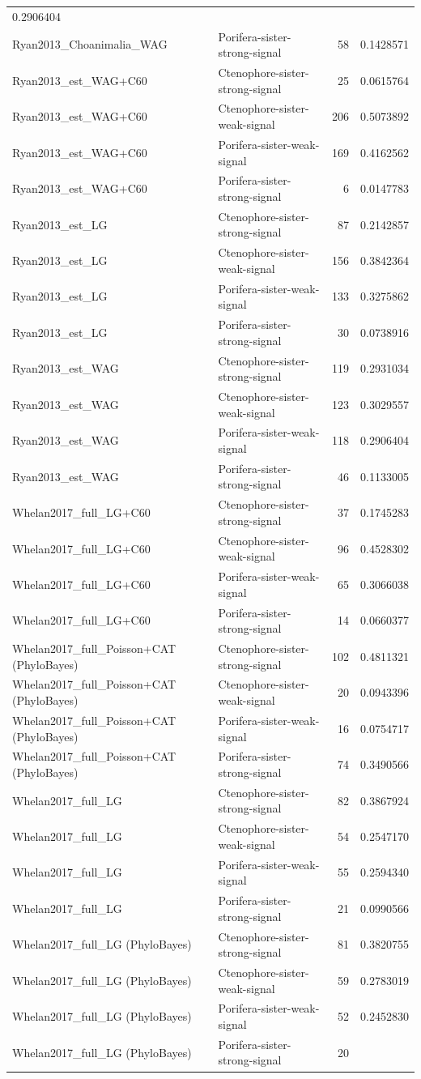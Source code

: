 \documentclass[]{article}
\begin{document}
\begin{longtable}[]{@{}llrr@{}}
0.2906404\tabularnewline
Ryan2013\_Choanimalia\_WAG & Porifera-sister-strong-signal & 58 &
0.1428571\tabularnewline
Ryan2013\_est\_WAG+C60 & Ctenophore-sister-strong-signal & 25 &
0.0615764\tabularnewline
Ryan2013\_est\_WAG+C60 & Ctenophore-sister-weak-signal & 206 &
0.5073892\tabularnewline
Ryan2013\_est\_WAG+C60 & Porifera-sister-weak-signal & 169 &
0.4162562\tabularnewline
Ryan2013\_est\_WAG+C60 & Porifera-sister-strong-signal & 6 &
0.0147783\tabularnewline
Ryan2013\_est\_LG & Ctenophore-sister-strong-signal & 87 &
0.2142857\tabularnewline
Ryan2013\_est\_LG & Ctenophore-sister-weak-signal & 156 &
0.3842364\tabularnewline
Ryan2013\_est\_LG & Porifera-sister-weak-signal & 133 &
0.3275862\tabularnewline
Ryan2013\_est\_LG & Porifera-sister-strong-signal & 30 &
0.0738916\tabularnewline
Ryan2013\_est\_WAG & Ctenophore-sister-strong-signal & 119 &
0.2931034\tabularnewline
Ryan2013\_est\_WAG & Ctenophore-sister-weak-signal & 123 &
0.3029557\tabularnewline
Ryan2013\_est\_WAG & Porifera-sister-weak-signal & 118 &
0.2906404\tabularnewline
Ryan2013\_est\_WAG & Porifera-sister-strong-signal & 46 &
0.1133005\tabularnewline
Whelan2017\_full\_LG+C60 & Ctenophore-sister-strong-signal & 37 &
0.1745283\tabularnewline
Whelan2017\_full\_LG+C60 & Ctenophore-sister-weak-signal & 96 &
0.4528302\tabularnewline
Whelan2017\_full\_LG+C60 & Porifera-sister-weak-signal & 65 &
0.3066038\tabularnewline
Whelan2017\_full\_LG+C60 & Porifera-sister-strong-signal & 14 &
0.0660377\tabularnewline
Whelan2017\_full\_Poisson+CAT (PhyloBayes) &
Ctenophore-sister-strong-signal & 102 & 0.4811321\tabularnewline
Whelan2017\_full\_Poisson+CAT (PhyloBayes) &
Ctenophore-sister-weak-signal & 20 & 0.0943396\tabularnewline
Whelan2017\_full\_Poisson+CAT (PhyloBayes) & Porifera-sister-weak-signal
& 16 & 0.0754717\tabularnewline
Whelan2017\_full\_Poisson+CAT (PhyloBayes) &
Porifera-sister-strong-signal & 74 & 0.3490566\tabularnewline
Whelan2017\_full\_LG & Ctenophore-sister-strong-signal & 82 &
0.3867924\tabularnewline
Whelan2017\_full\_LG & Ctenophore-sister-weak-signal & 54 &
0.2547170\tabularnewline
Whelan2017\_full\_LG & Porifera-sister-weak-signal & 55 &
0.2594340\tabularnewline
Whelan2017\_full\_LG & Porifera-sister-strong-signal & 21 &
0.0990566\tabularnewline
Whelan2017\_full\_LG (PhyloBayes) & Ctenophore-sister-strong-signal & 81
& 0.3820755\tabularnewline
Whelan2017\_full\_LG (PhyloBayes) & Ctenophore-sister-weak-signal & 59 &
0.2783019\tabularnewline
Whelan2017\_full\_LG (PhyloBayes) & Porifera-sister-weak-signal & 52 &
0.2452830\tabularnewline
Whelan2017\_full\_LG (PhyloBayes) & Porifera-sister-strong-signal & 20 &

\end{longtable}
\end{document}

